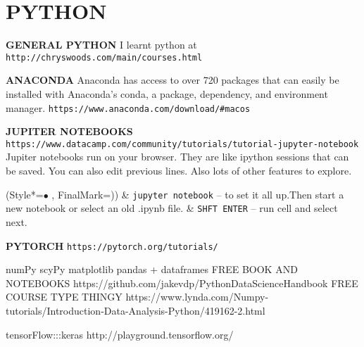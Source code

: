 \section{PYTHON}

\vspace{\baselineskip}
\textbf{GENERAL PYTHON}\newline
I learnt python at
\texttt{http://chryswoods.com/main/courses.html}

\vspace{\baselineskip}
\textbf{ANACONDA}\newline
Anaconda has access to over 720 packages that can easily be installed with Anaconda's conda, a package, dependency, and environment manager.\newline
\texttt{https://www.anaconda.com/download/\#macos}

\vspace{\baselineskip}
\textbf{JUPITER NOTEBOOKS}\newline
\texttt{https://www.datacamp.com/community/tutorials/tutorial-jupyter-notebook} \newline
Jupiter notebooks run on your browser.
They are like ipython sessions that can be saved.
You can also edit previous lines.
Also lots of other features to explore.\newline
\begin{easylist}[itemize]
\ListProperties(Style*=$\bullet$ , FinalMark={)})
& \texttt{jupyter notebook} -- to set it all up.\newline Then start a new notebook or select an old .ipynb file.
& \texttt{SHFT ENTER} -- run cell and select next.
\end{easylist}

\vspace{\baselineskip}
\textbf{PYTORCH}\newline
\texttt{https://pytorch.org/tutorials/}

\vspace{\baselineskip}
\vspace{\baselineskip}
\vspace{\baselineskip}
\vspace{\baselineskip}


numPy
scyPy
matplotlib
pandas + dataframes
FREE BOOK AND NOTEBOOKS
https://github.com/jakevdp/PythonDataScienceHandbook
FREE COURSE TYPE THINGY
https://www.lynda.com/Numpy-tutorials/Introduction-Data-Analysis-Python/419162-2.html


tensorFlow:::keras
http://playground.tensorflow.org/

\newpage